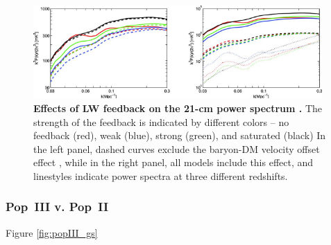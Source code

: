 \begin{figure}[]
\begin{center}
\includegraphics[width=0.98\textwidth]{Mirocha/fialkov2014_fig6.pdf}
\end{center}
\caption{{\bf Effects of LW feedback on the 21-cm power spectrum \cite{Fialkov2013}.} The strength of the feedback is indicated by different colors -- no feedback (red), weak (blue), strong (green), and saturated (black) In the left panel, dashed curves exclude the baryon-DM velocity offset effect \cite{Tseliakovich2010}, while in the right panel, all models include this effect, and linestyles indicate power spectra at three different redshifts.}
\label{fig:LWfeedback}
\end{figure}



%
\subsubsection{Pop~III v. Pop~II}
Figure \ref{fig:popIII_gs}

